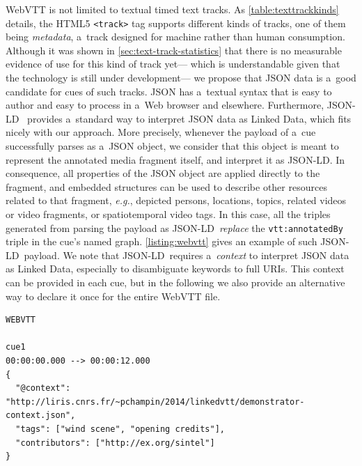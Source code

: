 \documentclass{sig-alternate}
\newcommand{\vtt}[1]{\texttt{vtt:#1}}
\def\JSONLD{\mbox{JSON-LD}}
\begin{document}
WebVTT is not limited to textual timed text tracks.
As \autoref{table:texttrackkinds} details, the HTML5
\texttt{<track>} tag supports different kinds of tracks,
one of them being \textit{metadata},
a~track designed for machine rather than human consumption.
Although it was shown in \autoref{sec:text-track-statistics}
that there is no measurable evidence of use for this kind of track yet---%
which is understandable given that the technology
is still under development---%
we propose that JSON data is a~good candidate for cues of such tracks.
JSON has a~textual syntax that is easy to author
and easy to process in a~Web browser and elsewhere.
Furthermore, \JSONLD~\cite{sporny2013jsonld} provides
a~standard way to interpret JSON data as Linked Data,
which fits nicely with our approach.
More precisely, whenever the payload of a~cue
successfully parses as a~JSON object,
we consider that this object is meant to
represent the annotated media fragment itself,
and interpret it as \JSONLD.
In consequence, all properties of the JSON object
are applied directly to the fragment,
and embedded structures can be used to describe
other resources related to that fragment,
\emph{e.g.}, depicted persons, locations, topics, related videos
or video fragments, or spatiotemporal video tags.
In this case, all the triples generated from parsing the payload as \JSONLD\
\emph{replace} the \vtt{annotatedBy} triple in the cue's named graph.
\autoref{listing:webvtt} gives an example of such \JSONLD\ payload.
We note that \JSONLD\ requires a~\emph{context}
to interpret JSON data as Linked Data,
especially to disambiguate keywords to full URIs.
This context can be provided in each cue,
but in the following we also provide an alternative way to declare it once
for the entire WebVTT file.

\begin{lstlisting}[caption={Sample WebVTT metadata file with \JSONLD\
  payload in a~cue identified as ``cue1''},
  label=listing:webvtt, float=t!]
WEBVTT

cue1
00:00:00.000 --> 00:00:12.000
{
  "@context": "http://liris.cnrs.fr/~pchampin/2014/linkedvtt/demonstrator-context.json",
  "tags": ["wind scene", "opening credits"],
  "contributors": ["http://ex.org/sintel"]
}
\end{lstlisting}
\end{document}
